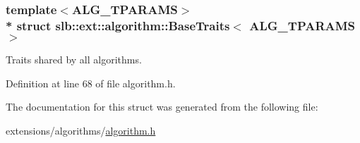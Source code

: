 \subsubsection*{template$<$A\+L\+G\+\_\+\+T\+P\+A\+R\+A\+MS$>$\\*
struct slb\+::ext\+::algorithm\+::\+Base\+Traits$<$ A\+L\+G\+\_\+\+T\+P\+A\+R\+A\+M\+S $>$}

Traits shared by all algorithms. 

Definition at line 68 of file algorithm.\+h.



The documentation for this struct was generated from the following file\+:\begin{DoxyCompactItemize}
\item 
extensions/algorithms/\hyperlink{algorithm_8h}{algorithm.\+h}\end{DoxyCompactItemize}
